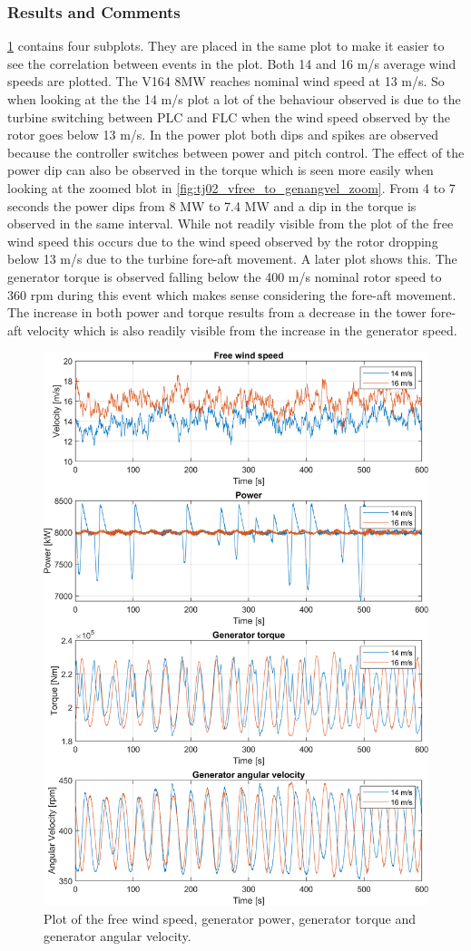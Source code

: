 \subsubsection{Results and Comments}
\cref{fig:tj02_vfree_to_genangvel} contains four subplots. They are placed in the same plot to make it easier to see the correlation between events in the plot. Both 14 and 16 m/s average wind speeds are plotted. The V164 8MW reaches nominal wind speed at 13 m/s. So when looking at the the 14 m/s plot a lot of the behaviour observed is due to the turbine switching between PLC and FLC when the wind speed observed by the rotor goes below 13 m/s. In the power plot both dips and spikes are observed because the controller switches between power and pitch control. The effect of the power dip can also be observed in the torque which is seen more easily when looking at the zoomed blot in \cref{fig:tj02_vfree_to_genangvel_zoom}. From 4 to 7 seconds the power dips from 8 MW to 7.4 MW and a dip in the torque is observed in the same interval. While not readily visible from the plot of the free wind speed this occurs due to the wind speed observed by the rotor dropping below 13 m/s due to the turbine fore-aft movement. A later plot shows this. The generator torque is observed falling below the 400 m/s nominal rotor speed to 360 rpm during this event which makes sense considering the fore-aft movement. The increase in both power and torque results from a decrease in the tower fore-aft velocity which is also readily visible from the increase in the generator speed.
\begin{figure}[ht]
	\centering
	\includegraphics[width=0.8\linewidth]{Graphics/TestResults/tj02/vhfree_power_genmom_omgen.png}
	\caption{Plot of the free wind speed, generator power, generator torque and generator angular velocity.}
	\label{fig:tj02_vfree_to_genangvel}
\end{figure}

